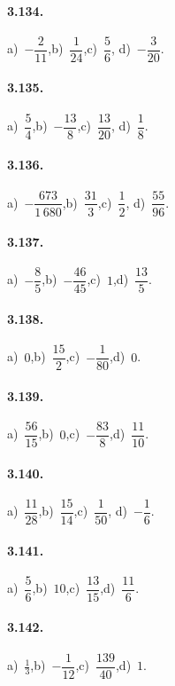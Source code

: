 \begin{multicols}{2}
\paragraph{3.134.}
a)~$-\dfrac{2}{11}$,\quad b)~$\dfrac{1}{24}$,\quad c)~$\dfrac{5}{6}$,%
\quad d)~$-\dfrac{3}{20}$.

\paragraph{3.135.}
a)~$\dfrac{5}{4}$,\quad b)~$-\dfrac{13}{8}$,\quad c)~$\dfrac{13}{20}$,%
\quad d)~$\dfrac{1}{8}$.

\paragraph{3.136.}
a)~$-\dfrac{673}{1\,680}$,\quad b)~$\dfrac{31}{3}$,\quad c)~$\dfrac{1}{2}$,%
\quad d)~$\dfrac{55}{96}$.

\paragraph{3.137.}
a)~$-\dfrac{8}{5}$,\quad b)~$-\dfrac{46}{45}$,\quad c)~$1$,\quad d)~$\dfrac{13}{5}$.

\paragraph{3.138.}
a)~$0$,\quad b)~$\dfrac{15}{2}$,\quad c)~$-\dfrac{1}{80}$,\quad d)~$0$.

\paragraph{3.139.}
a)~$\dfrac{56}{15}$,\quad b)~$0$,\quad c)~$-\dfrac{83}{8}$,\quad d)~$\dfrac{11}{10}$.

\paragraph{3.140.}
a)~$\dfrac{11}{28}$,\quad b)~$\dfrac{15}{14}$,\quad c)~$\dfrac{1}{50}$,\quad %
d)~$-\dfrac{1}{6}$.

\paragraph{3.141.}
a)~$\dfrac{5}{6}$,\quad b)~$10$,\quad c)~$\dfrac{13}{15}$,\quad d)~$\dfrac{11}{6}$.

\paragraph{3.142.}
a)~$\frac{1}{3}$,\quad b)~$-\dfrac{1}{12}$,\quad c)~$\dfrac{139}{40}$,\quad d)~$1$.


\end{multicols}
